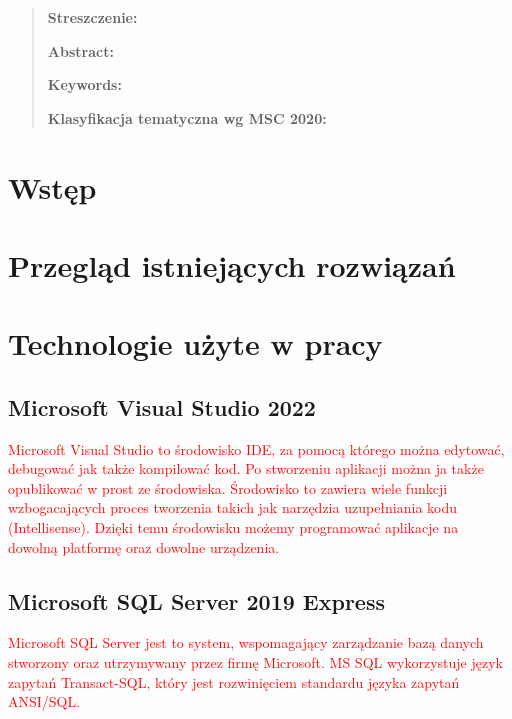 \documentclass[12pt,oneside]{report}
\begin{document}
	\begin{quote}{\small 
			\noindent
			
			\bigskip
			\noindent
			\textbf{Streszczenie:} 
			
			
			\noindent
			\newline
			\textbf{}
			\vspace{5pt}
			
			\noindent
			\newline
			\textbf{Abstract:} 
			\vspace{5pt}
			
			\vspace{5pt}
			\noindent
			\newline
			\textbf{Keywords:} 
			\vspace{5pt}
			\bigskip
			
			\noindent 
			\textbf{Klasyfikacja tematyczna wg  MSC 2020:}}
	\end{quote}

	\mbox{}
	
	\pagestyle{plain}
	\tableofcontents
	\thispagestyle{empty}
	
	
	\newpage
	\setcounter{page}{1}
	\newpage
\chapter{Wstęp}
\chapter{Przegląd istniejących rozwiązań}
\chapter{Technologie użyte w pracy}
\section{Microsoft Visual Studio 2022}
\textcolor{red} {Microsoft Visual Studio to środowisko IDE, za pomocą którego można edytować, debugować jak także kompilować kod. Po stworzeniu aplikacji można ja także opublikować w prost ze środowiska. Środowisko to zawiera wiele funkcji wzbogacających proces tworzenia takich jak narzędzia uzupełniania kodu (Intellisense). Dzięki temu środowisku możemy programować aplikacje na dowolną platformę oraz dowolne urządzenia. }
\section{Microsoft SQL Server 2019 Express}
\textcolor{red} {Microsoft SQL Server jest to system, wspomagający zarządzanie bazą danych stworzony oraz utrzymywany przez firmę Microsoft. MS SQL wykorzystuje język zapytań Transact-SQL, który jest rozwinięciem standardu języka zapytań ANSI/SQL.}
\end{document}
